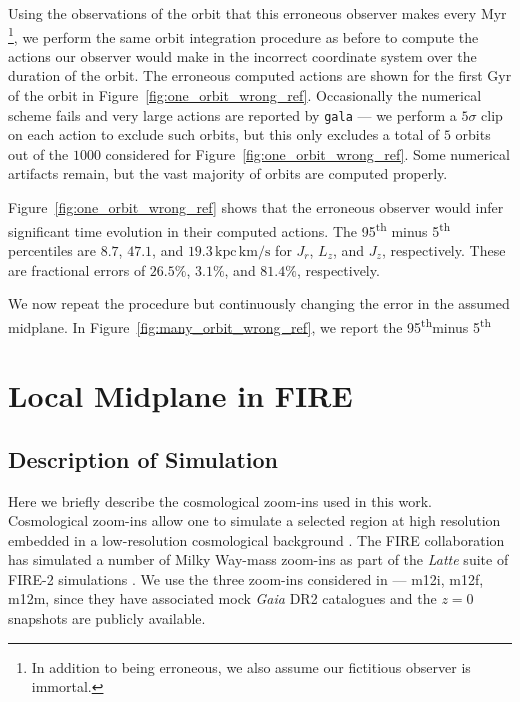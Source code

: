 \documentclass[twocolumn]{aastex62}
\newcommand{\Myr}{\text{Myr}}
\newcommand{\Gyr}{\text{Gyr}}
\newcommand{\kms}{\text{km}/\text{s}}
\newcommand{\actunit}{\text{kpc}\,\kms}
\newcommand{\uth}{\textsuperscript{th}}
\begin{document}
Using the observations of the orbit that this erroneous observer makes every
$\Myr$\footnote{In addition to being erroneous, we also assume our fictitious
observer is immortal.}, we perform the same orbit integration procedure as
before to compute the actions our observer would make in the incorrect
coordinate system over the duration of the orbit. The erroneous computed
actions are shown for the first $\Gyr$ of the orbit in
Figure~\ref{fig:one_orbit_wrong_ref}. Occasionally the numerical scheme fails
and very large actions are reported by \texttt{gala}
--- we perform a $5\sigma$ clip on each action to exclude such orbits, but
this only excludes a total of $5$ orbits out of the $1000$ considered for
Figure~\ref{fig:one_orbit_wrong_ref}. Some numerical artifacts remain, but the
vast majority of orbits are computed properly.

Figure~\ref{fig:one_orbit_wrong_ref} shows that the erroneous observer would
infer significant time evolution in their computed actions. The
95\textsuperscript{th} minus 5\textsuperscript{th} percentiles are $8.7$,
$47.1$, and $19.3\,\actunit$ for $J_r$, $L_z$, and $J_z$, respectively. These
are fractional errors of $26.5\%$, $3.1\%$, and $81.4\%$, respectively.

\begin{figure*}
\caption{Caption.}
\label{fig:one_orbit_wrong_ref}
\end{figure*}

We now repeat the procedure but continuously changing the error in the assumed
midplane. In Figure~\ref{fig:many_orbit_wrong_ref}, we report the 95\uth minus
5\uth



\begin{figure*}
\caption{Caption.}
\label{fig:many_orbit_wrong_ref}
\end{figure*}

\section{Local Midplane in FIRE} \label{sec:local_fire}
\subsection{Description of Simulation} \label{ssec:cosmozoom}
Here we briefly describe the cosmological zoom-ins used in this work.
Cosmological zoom-ins allow one to simulate a selected region at high
resolution embedded in a low-resolution cosmological background
\citep[e.g.][]{1993ApJ...412..455K,2014MNRAS.437.1894O}. The FIRE
collaboration has simulated a number of Milky Way-mass zoom-ins as part of the
{\em Latte} suite of FIRE-2 simulations
\citep{2016ApJ...827L..23W,2018MNRAS.481.4133G}. We use the three zoom-ins
considered in \citet{2018arXiv180610564S} --- m12i, m12f, m12m, since they
have associated mock {\em Gaia} DR2 catalogues and the $z=0$ snapshots are
publicly available.
\end{document}
